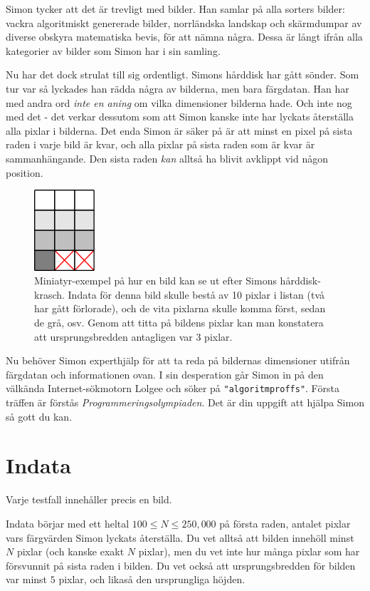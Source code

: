 
Simon tycker att det är trevligt med bilder. Han samlar på alla sorters bilder:
vackra algoritmiskt genererade bilder, norrländska landskap och skärmdumpar av
diverse obskyra matematiska bevis, för att nämna några. Dessa är långt ifrån
alla kategorier av bilder som Simon har i sin samling.

Nu har det dock strulat till sig ordentligt. Simons hårddisk har gått sönder.
Som tur var så lyckades han rädda några av bilderna, men bara färgdatan. Han
har med andra ord \emph{inte en aning} om vilka dimensioner bilderna hade. Och
inte nog med det - det verkar dessutom som att Simon kanske inte har lyckats
återställa alla pixlar i bilderna. Det enda Simon är säker på är att minst en
pixel på sista raden i varje bild är kvar, och alla pixlar på sista raden som
är kvar är sammanhängande. Den sista raden \emph{kan} alltså ha blivit avklippt
vid någon position.

\begin{figure}[ht!]
\centering
\includegraphics[width=0.2\textwidth]{example.png}
\caption{Miniatyr-exempel på hur en bild kan se ut efter Simons hårddisk-krasch. Indata
för denna bild skulle bestå av 10 pixlar i listan (två har gått förlorade), och de vita
pixlarna skulle komma först, sedan de grå, osv. Genom att titta på bildens pixlar kan
man konstatera att ursprungsbredden antagligen var 3 pixlar.}
\end{figure}

Nu behöver Simon experthjälp för att ta reda på bildernas dimensioner utifrån
färgdatan och informationen ovan. I sin desperation går Simon in på den
välkända Internet-sökmotorn Lolgee och söker på \texttt{"algoritmproffs"}.
Första träffen är förstås \emph{Programmeringsolympiaden}. Det är din uppgift
att hjälpa Simon så gott du kan.

\section*{Indata}
Varje testfall innehåller precis en bild.

Indata börjar med ett heltal $100 \leq N \leq 250,000$ på första raden, antalet pixlar vars
färgvärden Simon lyckats återställa. Du vet alltså att bilden innehöll minst
$N$ pixlar (och kanske exakt $N$ pixlar), men du vet inte hur många pixlar som
har försvunnit på sista raden i bilden. Du vet också att ursprungsbredden för
bilden var minst $5$ pixlar, och likaså den ursprungliga höjden.

